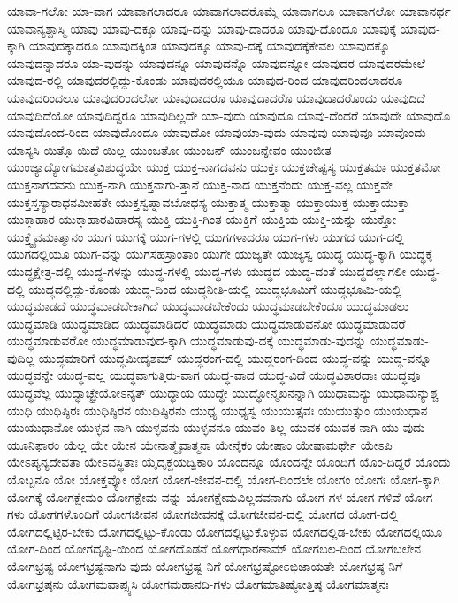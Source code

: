 {ಯಾವಾ-ಗಲೋ
ಯಾ-ವಾಗ
ಯಾವಾಗಲಾದರೂ
ಯಾವಾಗಲಾದರೊಮ್ಮೆ
ಯಾವಾಗಲೂ
ಯಾವಾಗಲೋ
ಯಾವಾನರ್ಥ
ಯಾವಾನ್ಯಶ್ಚಾಸ್ಮಿ
ಯಾವು
ಯಾವು-ದಕ್ಕೂ
ಯಾವು-ದನ್ನು
ಯಾವು-ದಾದರೂ
ಯಾವು-ದೊಂದೂ
ಯಾವುಕ್ಕೆ
ಯಾವುದ-ಕ್ಕಾಗಿ
ಯಾವುದಕ್ಕಾದರೂ
ಯಾವುದಕ್ಕಿಂತ
ಯಾವುದಕ್ಕೂ
ಯಾವು-ದಕ್ಕೆ
ಯಾವುದಕ್ಕೆಕೇವಲ
ಯಾವುದಕ್ಕೊ
ಯಾವುದನ್ನಾದರೂ
ಯಾ-ವುದನ್ನು
ಯಾವುದನ್ನೂ
ಯಾವುದನ್ನೊ
ಯಾವುದನ್ನೋ
ಯಾವುದರ
ಯಾವುದರಮೇಲೆ
ಯಾವುದ-ರಲ್ಲಿ
ಯಾವುದರಲ್ಲಿದ್ದು-ಕೊಂಡು
ಯಾವುದರಲ್ಲಿಯೂ
ಯಾವುದ-ರಿಂದ
ಯಾವುದರಿಂದಲಾದರೂ
ಯಾವುದರಿಂದಲೂ
ಯಾವುದರಿಂದಲೋ
ಯಾವುದಾದರೂ
ಯಾವುದಾದರೊ
ಯಾವುದಾದರೊಂದು
ಯಾವುದಿದೆ
ಯಾವುದಿದೆಯೋ
ಯಾವುದಿದ್ದರೂ
ಯಾವುದಿಲ್ಲದೇ
ಯಾ-ವುದು
ಯಾವುದೂ
ಯಾವು-ದೆಂದರೆ
ಯಾವುದೇ
ಯಾವುದೊ
ಯಾವುದೊಂದ-ರಿಂದ
ಯಾವುದೊಂದೂ
ಯಾವುದೋ
ಯಾವುಯಾ-ವುದು
ಯಾವುವು
ಯಾವುವೂ
ಯಾವೊಂದು
ಯಾಸ್ಯಸಿ
ಯಿತ್ತೊ
ಯಿದೆ
ಯಿಲ್ಲ
ಯುಂಜತೋ
ಯುಂಜನ್
ಯುಂಜನ್ನೇವಂ
ಯುಂಜೀತ
ಯುಂಜ್ಯಾದ್ಯೋಗಮಾತ್ಮವಿಶುದ್ಧಯೇ
ಯುಕ್ತ
ಯುಕ್ತ-ನಾಗದವನು
ಯುಕ್ತಃ
ಯುಕ್ತಚೇಷ್ಟಸ್ಯ
ಯುಕ್ತತಮಾ
ಯುಕ್ತತಮೋ
ಯುಕ್ತನಾಗದವನು
ಯುಕ್ತ-ನಾಗಿ
ಯುಕ್ತನಾಗು-ತ್ತಾನೆ
ಯುಕ್ತ-ನಾದ
ಯುಕ್ತನೆಂದು
ಯುಕ್ತ-ವಲ್ಲ
ಯುಕ್ತವೇ
ಯುಕ್ತಸ್ತಸ್ಯಾರಾಧನಮೀಹತೇ
ಯುಕ್ತಸ್ವಪ್ನಾವಬೋಧಸ್ಯ
ಯುಕ್ತಾತ್ಮ
ಯುಕ್ತಾತ್ಮಾ
ಯುಕ್ತಾಯುಕ್ತ
ಯುಕ್ತಾಯುಕ್ತಾ
ಯುಕ್ತಾಹಾರ
ಯುಕ್ತಾಹಾರವಿಹಾರಸ್ಯ
ಯುಕ್ತಿ
ಯುಕ್ತಿ-ಗಿಂತ
ಯುಕ್ತಿಗೆ
ಯುಕ್ತಿಯ
ಯುಕ್ತಿ-ಯನ್ನು
ಯುಕ್ತೋ
ಯುಕ್ತ್ವೈವಮಾತ್ಮಾನಂ
ಯುಗ
ಯುಗಕ್ಕೆ
ಯುಗ-ಗಳಲ್ಲಿ
ಯುಗಗಳಾದರೂ
ಯುಗ-ಗಳು
ಯುಗದ
ಯುಗ-ದಲ್ಲಿ
ಯುಗದಲ್ಲಿಯೂ
ಯುಗ-ವನ್ನು
ಯುಗಸಹಸ್ರಾಂತಾಂ
ಯುಗೇ
ಯುಜ್ಯತೇ
ಯುಜ್ಯಸ್ವ
ಯುದ್ಧ
ಯುದ್ಧ-ಕ್ಕಾಗಿ
ಯುದ್ಧಕ್ಕೆ
ಯುದ್ಧಕ್ಷೇತ್ರ-ದಲ್ಲಿ
ಯುದ್ಧ-ಗಳನ್ನು
ಯುದ್ಧ-ಗಳಲ್ಲಿ
ಯುದ್ಧ-ಗಳು
ಯುದ್ಧದ
ಯುದ್ಧ-ದಂತೆ
ಯುದ್ಧದಲ್ಲಾಗಲೀ
ಯುದ್ಧ-ದಲ್ಲಿ
ಯುದ್ಧದಲ್ಲಿದ್ದು-ಕೊಂಡು
ಯುದ್ಧ-ದಿಂದ
ಯುದ್ಧನೀತಿ-ಯಲ್ಲಿ
ಯುದ್ಧಭೂಮಿಗೆ
ಯುದ್ಧಭೂಮಿ-ಯಲ್ಲಿ
ಯುದ್ಧಮಾಡದೆ
ಯುದ್ಧಮಾಡಬೇಕಾಗಿದೆ
ಯುದ್ಧಮಾಡಬೇಕೆಂದು
ಯುದ್ಧಮಾಡಬೇಕೆಂದೂ
ಯುದ್ಧಮಾಡಲು
ಯುದ್ಧಮಾಡಿ
ಯುದ್ಧಮಾಡಿದ
ಯುದ್ಧಮಾಡಿದರೆ
ಯುದ್ಧಮಾಡು
ಯುದ್ಧಮಾಡುವನೋ
ಯುದ್ಧಮಾಡುವರೆ
ಯುದ್ಧಮಾಡುವರೋ
ಯುದ್ಧಮಾಡುವುದ-ಕ್ಕಾಗಿ
ಯುದ್ಧಮಾಡುವು-ದಕ್ಕೆ
ಯುದ್ಧಮಾಡು-ವುದನ್ನು
ಯುದ್ಧಮಾಡು-ವುದಿಲ್ಲ
ಯುದ್ಧಮಾರಿಗೆ
ಯುದ್ಧಮೀದೃಶಮ್
ಯುದ್ಧರಂಗ-ದಲ್ಲಿ
ಯುದ್ಧರಂಗ-ದಿಂದ
ಯುದ್ಧ-ವನ್ನು
ಯುದ್ಧ-ವನ್ನೂ
ಯುದ್ಧವನ್ನೇ
ಯುದ್ಧ-ವಲ್ಲ
ಯುದ್ಧವಾಗುತ್ತಿರು-ವಾಗ
ಯುದ್ಧ-ವಾದ
ಯುದ್ಧ-ವಿದೆ
ಯುದ್ಧವಿಶಾರದಾಃ
ಯುದ್ಧವೂ
ಯುದ್ಧವೆಲ್ಲ
ಯುದ್ಧಾಚ್ಛ್ರೇಯೋಽನ್ಯತ್
ಯುದ್ಧಾಯ
ಯುದ್ಧೇ
ಯುದ್ಧೋನ್ಮಖನನ್ನಾಗಿ
ಯುಧಾಮನ್ಯು
ಯುಧಾಮನ್ಯುಶ್ಚ
ಯುಧಿ
ಯುಧಿಷ್ಠಿರಃ
ಯುಧಿಷ್ಠಿರನ
ಯುಧಿಷ್ಠಿರನು
ಯುಧ್ಯ
ಯುಧ್ಯಸ್ವ
ಯುಯುತ್ಸವಃ
ಯುಯುತ್ಸುಂ
ಯುಯುಧಾನ
ಯುಯುಧಾನೋ
ಯುಳ್ಳವ-ನಾಗಿ
ಯುಳ್ಳವನು
ಯುಳ್ಳವನೂ
ಯುವಂ-ತಿಲ್ಲ
ಯುವಕ
ಯುವಕ-ನಾಗಿ
ಯು-ವುದು
ಯೂನಿಫಾರಂ
ಯೆಲ್ಲ
ಯೇ
ಯೇನ
ಯೇನಾತ್ಮೈವಾತ್ಮನಾ
ಯೇನೈಕಂ
ಯೇಷಾಂ
ಯೇಷಾಮರ್ಥೇ
ಯೇಽಪಿ
ಯೇಽಪ್ಯನ್ಯದೇವತಾ
ಯೇಽವಸ್ಥಿತಾಃ
ಯೈದೃಕ್ಚಯದ್ವಿಕಾರಿ
ಯೊಂದನ್ನೂ
ಯೊಂದನ್ನೇ
ಯೊಂದಿಗೆ
ಯೊಂ-ದಿದ್ದರೆ
ಯೊಂದು
ಯೊಬ್ಬನೂ
ಯೋ
ಯೋಕ್ತವ್ಯೋ
ಯೋಗ
ಯೋಗ-ಜೀವನ-ದಲ್ಲಿ
ಯೋಗ-ದಿಂದಲೇ
ಯೋಗಂ
ಯೋಗಃ
ಯೋಗ-ಕ್ಕಾಗಿ
ಯೋಗಕ್ಕೆ
ಯೋಗಕ್ಷೇಮಂ
ಯೋಗಕ್ಷೇಮ-ವನ್ನು
ಯೋಗಕ್ಷೇಮವಿಲ್ಲದವನಾಗು
ಯೋಗ-ಗಳ
ಯೋಗ-ಗಳಿವೆ
ಯೋಗ-ಗಳು
ಯೋಗಗಳೊಂದಿಗೆ
ಯೋಗಜೀವನ
ಯೋಗಜೀವನಕ್ಕೆ
ಯೋಗಜೀವನ-ದಲ್ಲಿ
ಯೋಗದ
ಯೋಗ-ದಲ್ಲಿ
ಯೋಗದಲ್ಲಿಟ್ಟಿರ-ಬೇಕು
ಯೋಗದಲ್ಲಿಟ್ಟು-ಕೊಂಡು
ಯೋಗದಲ್ಲಿಟ್ಟುಕೊಳ್ಳುವ
ಯೋಗದಲ್ಲಿಡ-ಬೇಕು
ಯೋಗದಲ್ಲಿಯೂ
ಯೋಗ-ದಿಂದ
ಯೋಗದೃಷ್ಟಿ-ಯಿಂದ
ಯೋಗದೊಡನೆ
ಯೋಗಧಾರಣಾಮ್
ಯೋಗಬಲ-ದಿಂದ
ಯೋಗಬಲೇನ
ಯೋಗಭ್ರಷ್ಟ
ಯೋಗಭ್ರಷ್ಟನಾಗು-ವುದು
ಯೋಗಭ್ರಷ್ಟ-ನಿಗೆ
ಯೋಗಭ್ರಷ್ಟೋಽಭಿಜಾಯತೇ
ಯೋಗಭ್ರಷ್ಠ-ನಿಗೆ
ಯೋಗಭ್ರಷ್ಠನು
ಯೋಗಮವಾಪ್ಸ್ಯಸಿ
ಯೋಗಮಹಾನದಿ-ಗಳು
ಯೋಗಮಾತಿಷ್ಠೋತ್ತಿಷ್ಠ
ಯೋಗಮಾತ್ಮನಃ
}
